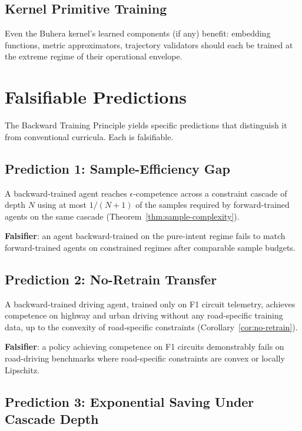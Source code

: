 \documentclass[11pt,twocolumn,a4paper]{article}
\begin{document}
\subsection{Kernel Primitive Training}

Even the Buhera kernel's learned components (if any) benefit: embedding functions, metric approximators, trajectory validators should each be trained at the extreme regime of their operational envelope.


\section{Falsifiable Predictions}
\label{sec:predictions}

The Backward Training Principle yields specific predictions that distinguish it from conventional curricula. Each is falsifiable.

\subsection{Prediction 1: Sample-Efficiency Gap}

A backward-trained agent reaches $\epsilon$-competence across a constraint cascade of depth $N$ using at most $1/(N+1)$ of the samples required by forward-trained agents on the same cascade (Theorem~\ref{thm:sample-complexity}).

\textbf{Falsifier}: an agent backward-trained on the pure-intent regime fails to match forward-trained agents on constrained regimes after comparable sample budgets.

\subsection{Prediction 2: No-Retrain Transfer}

A backward-trained driving agent, trained only on F1 circuit telemetry, achieves competence on highway and urban driving without any road-specific training data, up to the convexity of road-specific constraints (Corollary~\ref{cor:no-retrain}).

\textbf{Falsifier}: a policy achieving competence on F1 circuits demonstrably fails on road-driving benchmarks where road-specific constraints are convex or locally Lipschitz.

\subsection{Prediction 3: Exponential Saving Under Cascade Depth}
\end{document}
